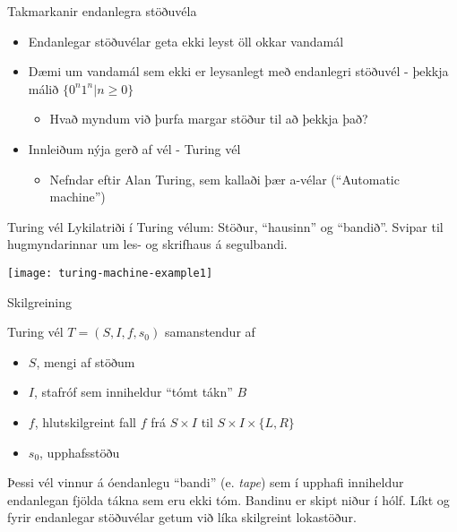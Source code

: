 \documentclass{beamer}
\begin{document}
\begin{frame}{Takmarkanir endanlegra stöðuvéla}
\begin{itemize}
 \item Endanlegar stöðuvélar geta ekki leyst öll okkar vandamál
 \item Dæmi um vandamál sem ekki er leysanlegt með endanlegri stöðuvél - þekkja málið $\{0^n1^n | n\geq 0\}$
 \begin{itemize}
  \item Hvað myndum við þurfa margar stöður til að þekkja það?
 \end{itemize}
 \item Innleiðum nýja gerð af vél - Turing vél
 \begin{itemize}
  \item Nefndar eftir Alan Turing, sem kallaði þær a-vélar (``Automatic machine'')
 \end{itemize}
\end{itemize}
\end{frame}

\begin{frame}{Turing vél}
Lykilatriði í Turing vélum: Stöður, ``hausinn'' og ``bandið''. Svipar til hugmyndarinnar um les- og skrifhaus á segulbandi.
\begin{center}
\texttt{[image: turing-machine-example1]}
\end{center}
\end{frame}

\begin{frame}{Skilgreining}
\begin{tcolorbox}[title=Turing vél]
Turing vél $T = (S, I, f, s_0)$ samanstendur af
\begin{itemize}
 \item $S$, mengi af stöðum
 \item $I$, stafróf sem inniheldur ``tómt tákn'' $B$
 \item $f$, hlutskilgreint fall $f$ frá $S \times I$ til $S \times I \times \{L, R\}$
 \item $s_0$, upphafsstöðu
\end{itemize}
\end{tcolorbox}
Þessi vél vinnur á óendanlegu ``bandi'' (e. \emph{tape}) sem í upphafi inniheldur endanlegan fjölda tákna sem eru ekki tóm. Bandinu er skipt niður í hólf. Líkt og fyrir endanlegar stöðuvélar getum við líka skilgreint lokastöður.
\end{frame}
\end{document}
